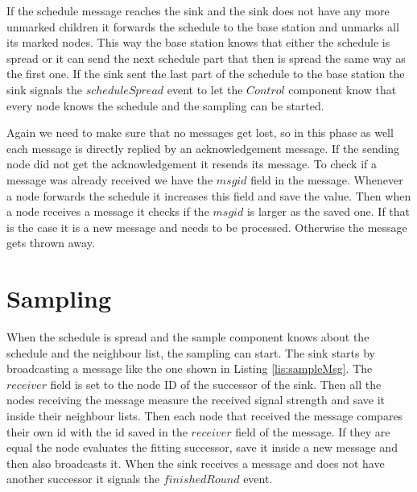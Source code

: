 If the schedule message reaches the sink and the sink does not have any more unmarked children it forwards the schedule to the base station and unmarks all its marked nodes. This way the base station knows that either the schedule is spread or it can send the next schedule part that then is spread the same way as the first one. If the sink sent the last part of the schedule to the base station the sink signals the $scheduleSpread$ event to let the $Control$ component know that every node knows the schedule and the sampling can be started. 

Again we need to make sure that no messages get lost, so in this phase as well each message is directly replied by an acknowledgement message. If the sending node did not get the acknowledgement it resends its message. To check if a message was already received we have the $msgid$ field in the message. Whenever a node forwards the schedule it increases this field and save the value. Then when a node receives a message it checks if the $msgid$ is larger as the saved one. If that is the case it is a new message and needs to be processed. Otherwise the message gets thrown away. 
\section{Sampling}
When the schedule is spread and the sample component knows about the schedule and the neighbour list, the sampling can start. The sink starts by broadcasting a  message like the one shown in Listing \ref{lis:sampleMsg}. The $receiver$ field is set to the node ID of the successor of the sink. Then all the nodes receiving the message measure the received signal strength and save it inside their neighbour lists. Then each node that received the message compares their own id with the id saved in the $receiver$ field of the message. If they are equal the node evaluates the fitting successor, save it inside a new message and then also broadcasts it. When the sink receives a message and does not have another successor it signals the $finishedRound$ event.

